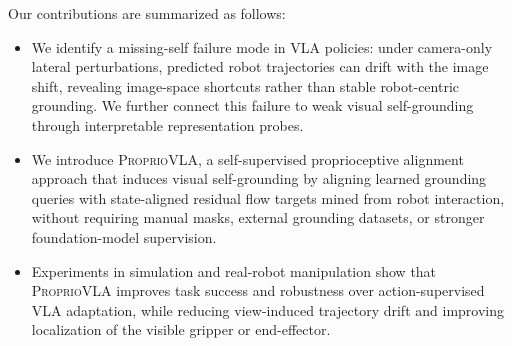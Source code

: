 Our contributions are summarized as follows:
\begin{itemize}
    \item We identify a missing-self failure mode in VLA policies: under
    camera-only lateral perturbations, predicted robot trajectories can drift
    with the image shift, revealing image-space shortcuts rather than stable
    robot-centric grounding. We further connect this failure to weak visual
    self-grounding through interpretable representation probes.

    \item We introduce \textsc{ProprioVLA}, a self-supervised proprioceptive
    alignment approach that induces visual self-grounding by aligning learned
    grounding queries with state-aligned residual flow targets mined from robot
    interaction, without requiring manual masks, external grounding datasets,
    or stronger foundation-model supervision.

    \item Experiments in simulation and real-robot manipulation show that
    \textsc{ProprioVLA} improves task success and robustness over
    action-supervised VLA adaptation, while reducing view-induced trajectory
    drift and improving localization of the visible gripper or end-effector.
\end{itemize}
